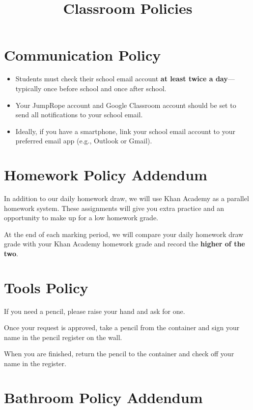 \documentclass[12pt]{article}
\title{\textbf{Classroom Policies}}
\date{}
\begin{document}
\maketitle

\section{Communication Policy}

\begin{itemize}
    \item Students must check their school email account \textbf{at least twice a day}---typically once before school and once after school.
    \item Your JumpRope account and Google Classroom account should be set to send all notifications to your school email.
    \item Ideally, if you have a smartphone, link your school email account to your preferred email app (e.g., Outlook or Gmail).
\end{itemize}

\section{Homework Policy Addendum}

In addition to our daily homework draw, we will use Khan Academy as a parallel homework system. These assignments will give you extra practice and an opportunity to make up for a low homework grade.

At the end of each marking period, we will compare your daily homework draw grade with your Khan Academy homework grade and record the \textbf{higher of the two}.

\section{Tools Policy}

If you need a pencil, please raise your hand and ask for one.

Once your request is approved, take a pencil from the container and sign your name in the pencil register on the wall.

When you are finished, return the pencil to the container and check off your name in the register.

\section{Bathroom Policy Addendum}
\end{document}
